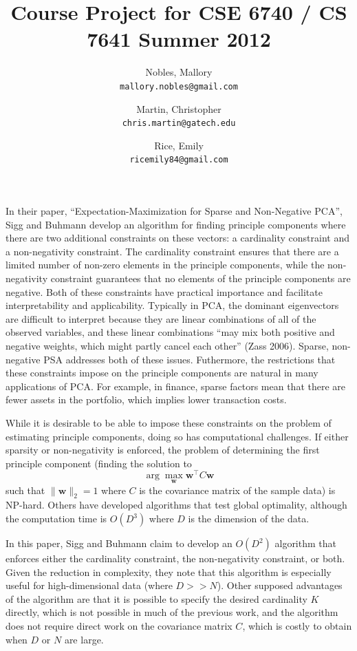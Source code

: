 \documentclass[twocolumn]{article}
\title{Course Project for CSE 6740 / CS 7641 Summer 2012}
\author{Nobles, Mallory \\ \texttt{mallory.nobles@gmail.com}
  \and Martin, Christopher \\ \texttt{chris.martin@gatech.edu}
  \and Rice, Emily \\ \texttt{ricemily84@gmail.com} }
\date{}
\begin{document}
\maketitle

In their paper, ``Expectation-Maximization for Sparse and Non-Negative PCA'',
Sigg and Buhmann develop an algorithm for finding principle components where
there are two additional constraints on these vectors:
a cardinality constraint and a non-negativity constraint.
The cardinality constraint ensures that there are a limited number
of non-zero elements in the principle components, while
the non-negativity constraint guarantees that no elements of
the principle components are negative.
Both of these constraints have practical importance and facilitate
interpretability and applicability.
Typically in PCA, the dominant eigenvectors are difficult to interpret
because they are linear combinations of all of the observed variables,
and these linear combinations ``may mix both positive and negative weights,
which might partly cancel each other'' (Zass 2006).
Sparse, non-negative PSA addresses both of these issues.
Futhermore, the restrictions that these constraints impose on the
principle components are natural in many applications of PCA.
For example, in finance, sparse factors mean that there are
fewer assets in the portfolio, which implies lower transaction costs.

While it is desirable to be able to impose these constraints on
the problem of estimating principle components, doing so has
computational challenges. If either sparsity or non-negativity
is enforced, the problem of determining the first principle component
(finding the solution to
\[ \arg\max_{\mathbf{w}} \mathbf{w}^\intercal C\mathbf{w} \]
such that $\|\mathbf{w}\|_2 = 1$
where $C$ is the covariance matrix of the sample data) is NP-hard.
Others have developed algorithms that test global optimality, although
the computation time is $O(D^3)$ where $D$ is the dimension of the data.

In this paper, Sigg and Buhmann claim to develop an $O(D^2)$ algorithm
that enforces either the cardinality constraint,
the non-negativity constraint, or both.
Given the reduction in complexity, they note that this algorithm is
especially useful for high-dimensional data (where $D >> N$).
Other supposed advantages of the algorithm are that it is possible
to specify the desired cardinality $K$ directly, which is not possible
in much of the previous work, and the algorithm does not require
direct work on the covariance matrix $C$, which is costly to obtain
when $D$ or $N$ are large.
\end{document}
